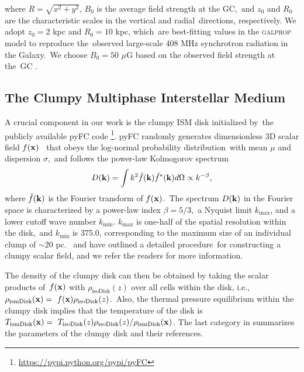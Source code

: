 \documentclass[fleqn,usenatbib,useAMS]{mnras}
\begin{document}
  where $R=\sqrt{x^{2}+y^{2}}$, $B_{0}$ is the average field strength at the GC,\
  and $z_{0}$ and $R_{0}$ are the characteristic scales in the vertical and radial\
  directions, respectively. We adopt $z_{0} = 2$ kpc and $R_{0} = 10$ kpc, which\
  are best-fitting values in the \textsc{galprop} model to reproduce the\
  observed large-scale 408 MHz synchrotron radiation in the Galaxy.\
  We choose $B_{0} = 50$ $\mu$G based on the observed field strength at the\
  GC \citep{Crocker2010}.



  \subsection{The Clumpy Multiphase Interstellar Medium}

  A crucial component in our work is the clumpy ISM disk initialized by\
  the publicly available pyFC code
  \footnote{\url{https://pypi.python.org/pypi/pyFC}}.
  pyFC randomly generates dimensionless 3D scalar field $f(\bold{x})$\ %
  that obeys the log-normal probability distribution\
  with mean $\mu$ and dispersion $\sigma$,\
  and follows the power-law Kolmogorov spectrum
  \begin{equation}
    D(\bold{k})=\int k^{2} \hat{f}(\bold{k})\hat{f}^{*}(\bold{k})d\Omega \propto k^{-\beta},
    \label{Kolmogorov-spectrum}
  \end{equation}
  where $\hat{f}(\bold{k})$ is the Fourier transform of $f(\bold{x})$.\
  The spectrum $D(\bold{k})$ in the Fourier space is characterized by a power-law index $\beta=5/3$,\
  a Nyquist limit $k_{\text{max}}$, and a lower cutoff wave number $k_{\text{min}}$.
  $k_{\text{max}}$ is one-half of the spatial resolution within the disk,\
  and $k_{\text{min}}$ is 375.0, corresponding to the maximum size of an individual clump of $\sim 20$ pc.\
  \citet{LA2002} and \citet{Wagner2012} have outlined a detailed procedure\
  for constructing a clumpy scalar field, and we refer the readers for more information.

  The density of the clumpy disk can then be obtained by taking the scalar products of\
  $f(\bold{x})$ with $\rho_{\text{isoDisk}}(z)$ over all cells within the disk, i.e.,\
  $\displaystyle\rho_{\text{ismDisk}}(\bold{x}) =\
  f(\bold{x}) \rho_{\text{isoDisk}}(z)$.\
  Also, the thermal pressure equilibrium within the clumpy disk implies that the temperature of the disk is
  $\displaystyle T_{\text{ismDisk}}(\bold{x}) =\
  T_{\text{isoDisk}}(z)\rho_{\text{isoDisk}}(z)/\rho_{\text{ismDisk}}(\bold{x})$. The last category in  summarizes the parameters of the clumpy disk and their references.
\end{document}
